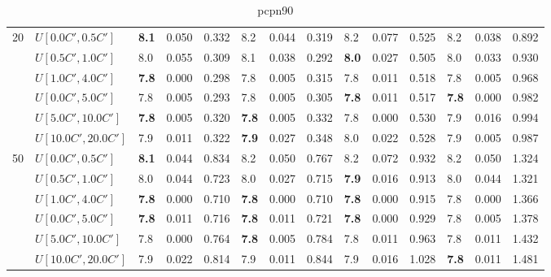 \begin{table}[h]
{\begin{tabular}{|l|l||l|l|l||l|l|l||l|l|l||l|l|l|}
      \hline\hline
      \multirow{6}{*}{20} & $U[0.0C',0.5C']$ & \textbf{8.1} & 0.050 & 0.332 & 8.2 & 0.044 & 0.319 & 8.2 & 0.077 & 0.525 & 8.2 & 0.038 & 0.892 \\
       & $U[0.5C',1.0C']$ & 8.0 & 0.055 & 0.309 & 8.1 & 0.038 & 0.292 & \textbf{8.0} & 0.027 & 0.505 & 8.0 & 0.033 & 0.930 \\
       & $U[1.0C',4.0C']$ & \textbf{7.8} & 0.000 & 0.298 & 7.8 & 0.005 & 0.315 & 7.8 & 0.011 & 0.518 & 7.8 & 0.005 & 0.968 \\
       & $U[0.0C',5.0C']$ & 7.8 & 0.005 & 0.293 & 7.8 & 0.005 & 0.305 & \textbf{7.8} & 0.011 & 0.517 & \textbf{7.8} & 0.000 & 0.982 \\
       & $U[5.0C',10.0C']$ & \textbf{7.8} & 0.005 & 0.320 & \textbf{7.8} & 0.005 & 0.332 & 7.8 & 0.000 & 0.530 & 7.9 & 0.016 & 0.994 \\
       & $U[10.0C',20.0C']$ & 7.9 & 0.011 & 0.322 & \textbf{7.9} & 0.027 & 0.348 & 8.0 & 0.022 & 0.528 & 7.9 & 0.005 & 0.987 \\
      \hline\hline
      \multirow{6}{*}{50} & $U[0.0C',0.5C']$ & \textbf{8.1} & 0.044 & 0.834 & 8.2 & 0.050 & 0.767 & 8.2 & 0.072 & 0.932 & 8.2 & 0.050 & 1.324 \\
       & $U[0.5C',1.0C']$ & 8.0 & 0.044 & 0.723 & 8.0 & 0.027 & 0.715 & \textbf{7.9} & 0.016 & 0.913 & 8.0 & 0.044 & 1.321 \\
       & $U[1.0C',4.0C']$ & \textbf{7.8} & 0.000 & 0.710 & \textbf{7.8} & 0.000 & 0.710 & \textbf{7.8} & 0.000 & 0.915 & 7.8 & 0.000 & 1.366 \\
       & $U[0.0C',5.0C']$ & \textbf{7.8} & 0.011 & 0.716 & \textbf{7.8} & 0.011 & 0.721 & \textbf{7.8} & 0.000 & 0.929 & 7.8 & 0.005 & 1.378 \\
       & $U[5.0C',10.0C']$ & 7.8 & 0.000 & 0.764 & \textbf{7.8} & 0.005 & 0.784 & 7.8 & 0.011 & 0.963 & 7.8 & 0.011 & 1.432 \\
       & $U[10.0C',20.0C']$ & 7.9 & 0.022 & 0.814 & 7.9 & 0.011 & 0.844 & 7.9 & 0.016 & 1.028 & \textbf{7.8} & 0.011 & 1.481 \\
      \hline
      \end{tabular}
      }
      \caption{pcpn90}
      \label{tab:pcpn90}\end{table}



